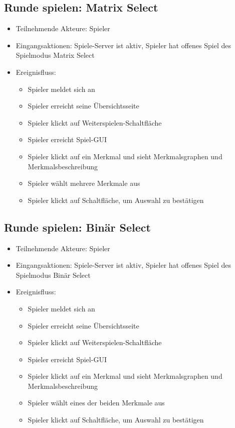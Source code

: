 \documentclass[a4paper]{scrreprt}
\begin{document}
   
    \subsection{Runde spielen: Matrix Select}
    \begin{itemize}
    	\item Teilnehmende Akteure: \Gls{Spieler}
    	\item Eingangsaktionen: Spiele-Server ist aktiv, Spieler hat offenes Spiel des \Gls{Spielmodus} Matrix Select
    	\item Ereignisfluss:
    	\begin{itemize}
    		\item \Gls{Spieler} meldet sich an
    		\item \Gls{Spieler} erreicht seine Übersichtsseite
    		\item \Gls{Spieler} klickt auf Weiterspielen-Schaltfläche
    		\item \Gls{Spieler} erreicht Spiel-GUI
    		\item \Gls{Spieler} klickt auf ein Merkmal und sieht Merkmalsgraphen und Merkmalsbeschreibung
    		\item \Gls{Spieler} wählt mehrere Merkmale aus
    		\item \Gls{Spieler} klickt auf Schaltfläche, um Auswahl zu bestätigen
    	\end{itemize}
    \end{itemize}
	
	\subsection{Runde spielen: Binär Select}
	\begin{itemize}
		\item Teilnehmende Akteure: \Gls{Spieler}
		\item Eingangsaktionen: Spiele-Server ist aktiv, \Gls{Spieler} hat offenes Spiel des \Gls{Spielmodus} Binär Select
		\item Ereignisfluss:
		\begin{itemize}
			\item \Gls{Spieler} meldet sich an
			\item \Gls{Spieler} erreicht seine Übersichtsseite
			\item \Gls{Spieler} klickt auf Weiterspielen-Schaltfläche
			\item \Gls{Spieler} erreicht Spiel-GUI
			\item \Gls{Spieler} klickt auf ein Merkmal und sieht Merkmalsgraphen und Merkmalsbeschreibung
			\item \Gls{Spieler} wählt eines der beiden Merkmale aus
			\item \Gls{Spieler} klickt auf Schaltfläche, um Auswahl zu bestätigen
		\end{itemize}
	\end{itemize}
\end{document}

